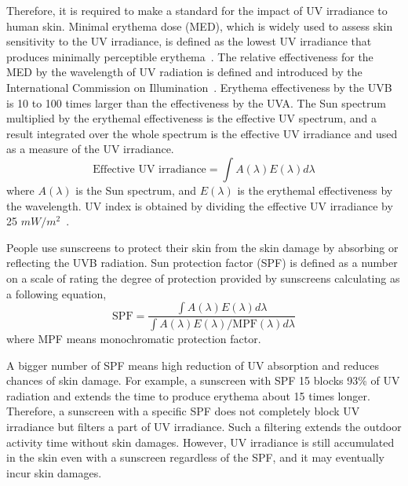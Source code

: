 \documentclass[journal]{IEEEtran}
\begin{document}

Therefore, it is required to make a standard for the impact of UV irradiance to human skin.
Minimal erythema dose (MED), which is widely used to assess skin sensitivity to the UV irradiance, is defined as the lowest UV irradiance that produces minimally perceptible erythema~\cite{Diffey:CPPM91}.
The relative effectiveness for the MED by the wavelength of UV radiation is defined and introduced by the International Commission on Illumination~\cite{CIE}.
Erythema effectiveness by the UVB is 10 to 100 times larger than the effectiveness by the UVA.
The Sun spectrum multiplied by the erythemal effectiveness is the effective UV spectrum, and a result integrated over the whole spectrum is the effective UV irradiance and used as a measure of the UV irradiance.
%
\begin{equation}
\text{Effective~UV~irradiance} = \int A(\lambda)E(\lambda) d \lambda
 \end{equation}
%
where $A(\lambda)$ is the Sun spectrum, and $E(\lambda)$ is the erythemal effectiveness by the wavelength.
UV index is obtained by dividing the effective UV irradiance by 25 $mW/m^2$~\cite{CIE}.


People use sunscreens to protect their skin from the skin damage by absorbing or reflecting the UVB radiation.
Sun protection factor (SPF) is defined as a number on a scale of rating the degree of protection provided by sunscreens calculating as a following equation,
%
\begin{equation}
\text{SPF} = \frac{\int A(\lambda)E(\lambda) d \lambda}{\int A(\lambda)E(\lambda) / \text{MPF}(\lambda) d \lambda}
 \end{equation}
%
where MPF means monochromatic protection factor.

A bigger number of SPF means high reduction of UV absorption and reduces chances of skin damage.
For example, a sunscreen with SPF 15 blocks 93\% of UV radiation and extends the time to produce erythema about 15 times longer.
Therefore, a sunscreen with a specific SPF does not completely block UV irradiance but filters a part of UV irradiance.
Such a filtering extends the outdoor activity time without skin damages.
However, UV irradiance is still accumulated in the skin even with a sunscreen regardless of the SPF, and it may eventually incur skin damages.
\end{document}
